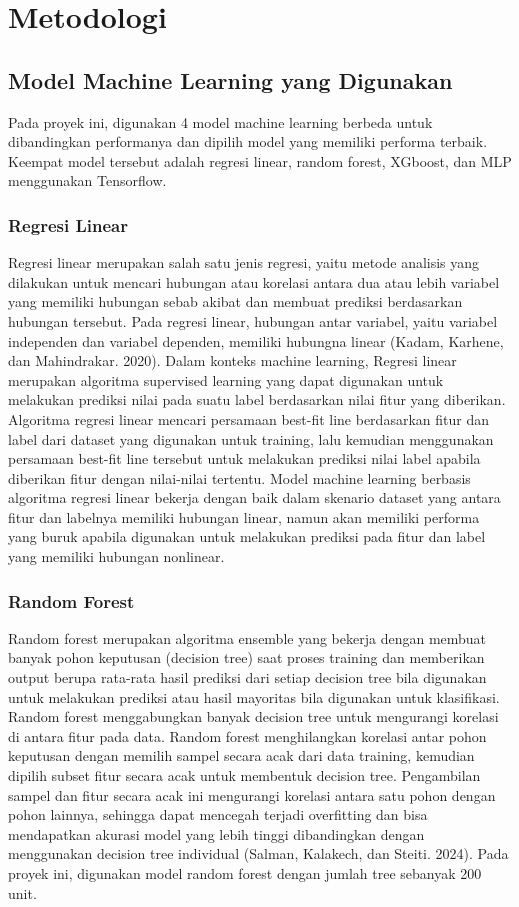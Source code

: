 \chapter*{Metodologi}

\section{Model Machine Learning yang Digunakan}
Pada proyek ini, digunakan 4 model machine learning berbeda untuk dibandingkan performanya dan dipilih model yang memiliki performa terbaik. Keempat model tersebut adalah regresi linear, random forest, XGboost, dan MLP menggunakan Tensorflow.

\subsection{Regresi Linear}
Regresi linear merupakan salah satu jenis regresi, yaitu metode analisis yang dilakukan untuk mencari hubungan atau korelasi antara dua atau lebih variabel yang memiliki hubungan sebab akibat dan membuat prediksi berdasarkan hubungan tersebut. Pada regresi linear, hubungan antar variabel, yaitu variabel independen dan variabel dependen, memiliki hubungna linear (Kadam, Karhene, dan Mahindrakar. 2020). Dalam konteks machine learning, Regresi linear merupakan algoritma supervised learning yang dapat digunakan untuk melakukan prediksi nilai pada suatu label berdasarkan nilai fitur yang diberikan. Algoritma regresi linear mencari persamaan best-fit line berdasarkan fitur dan label dari dataset yang digunakan untuk training, lalu kemudian menggunakan persamaan best-fit line tersebut untuk melakukan prediksi nilai label apabila diberikan fitur dengan nilai-nilai tertentu. Model machine learning berbasis algoritma regresi linear bekerja dengan baik dalam skenario dataset yang antara fitur dan labelnya memiliki hubungan linear, namun akan memiliki performa yang buruk apabila digunakan untuk melakukan prediksi pada fitur dan label yang memiliki hubungan nonlinear.

\subsection{Random Forest}
Random forest merupakan algoritma ensemble yang bekerja dengan membuat banyak pohon keputusan (decision tree) saat proses training dan memberikan output berupa rata-rata hasil prediksi dari setiap decision tree bila digunakan untuk melakukan prediksi atau hasil mayoritas bila digunakan untuk klasifikasi. Random forest menggabungkan banyak decision tree untuk mengurangi korelasi di antara fitur pada data. Random forest menghilangkan korelasi antar pohon keputusan dengan memilih sampel secara acak dari data training, kemudian dipilih subset fitur secara acak untuk membentuk decision tree. Pengambilan sampel dan fitur secara acak ini mengurangi korelasi antara satu pohon dengan pohon lainnya, sehingga dapat mencegah terjadi overfitting dan bisa mendapatkan akurasi model yang lebih tinggi dibandingkan dengan menggunakan decision tree individual (Salman, Kalakech, dan Steiti. 2024). Pada proyek ini, digunakan model random forest dengan jumlah tree sebanyak 200 unit.


